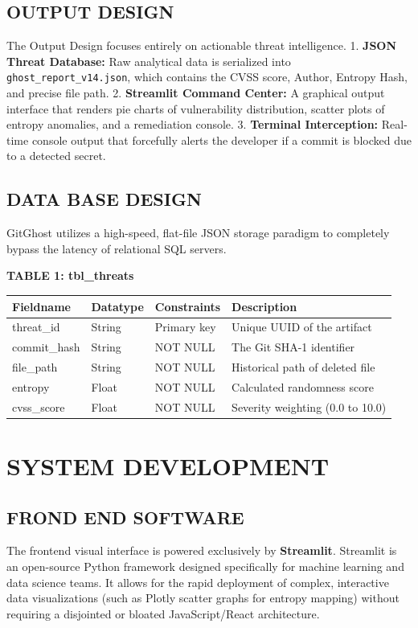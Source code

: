 \documentclass[12pt, a4paper, oneside]{report}
\begin{document}
\section{OUTPUT DESIGN}
The Output Design focuses entirely on actionable threat intelligence.
1. \textbf{JSON Threat Database:} Raw analytical data is serialized into \texttt{ghost\_report\_v14.json}, which contains the CVSS score, Author, Entropy Hash, and precise file path.
2. \textbf{Streamlit Command Center:} A graphical output interface that renders pie charts of vulnerability distribution, scatter plots of entropy anomalies, and a remediation console.
3. \textbf{Terminal Interception:} Real-time console output that forcefully alerts the developer if a commit is blocked due to a detected secret.

\section{DATA BASE DESIGN}
GitGhost utilizes a high-speed, flat-file JSON storage paradigm to completely bypass the latency of relational SQL servers.

\textbf{TABLE 1: tbl\_threats}
\begin{table}[H]
\centering
\begin{tabular}{|l|l|l|p{6cm}|}
\hline
\textbf{Fieldname} & \textbf{Datatype} & \textbf{Constraints} & \textbf{Description} \\ \hline
threat\_id & String & Primary key & Unique UUID of the artifact \\ \hline
commit\_hash & String & NOT NULL & The Git SHA-1 identifier \\ \hline
file\_path & String & NOT NULL & Historical path of deleted file \\ \hline
entropy & Float & NOT NULL & Calculated randomness score \\ \hline
cvss\_score & Float & NOT NULL & Severity weighting (0.0 to 10.0) \\ \hline
\end{tabular}
\end{table}

\chapter{SYSTEM DEVELOPMENT}

\section{FROND END SOFTWARE}
The frontend visual interface is powered exclusively by \textbf{Streamlit}. Streamlit is an open-source Python framework designed specifically for machine learning and data science teams. It allows for the rapid deployment of complex, interactive data visualizations (such as Plotly scatter graphs for entropy mapping) without requiring a disjointed or bloated JavaScript/React architecture.
\end{document}
